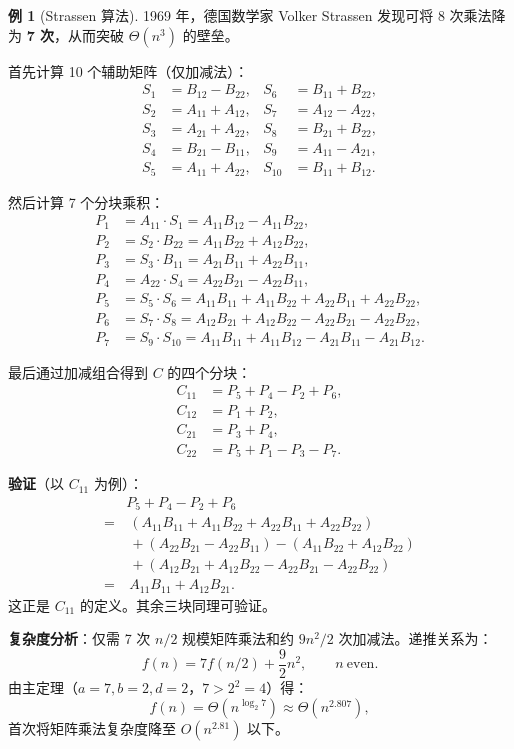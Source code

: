 \documentclass[UTF8,11pt,a4paper]{ctexbook}   %
\theoremstyle{definition}
\newtheorem{example}{例}[section]
\begin{document}
\begin{example}[Strassen 算法]
1969 年，德国数学家 Volker Strassen 发现可将 8 次乘法降为 \textbf{7 次}，从而突破 $\Theta(n^3)$ 的壁垒。

首先计算 10 个辅助矩阵（仅加减法）：
\begin{align*}
S_1 &= B_{12} - B_{22}, & S_6 &= B_{11} + B_{22},\\
S_2 &= A_{11} + A_{12}, & S_7 &= A_{12} - A_{22},\\
S_3 &= A_{21} + A_{22}, & S_8 &= B_{21} + B_{22},\\
S_4 &= B_{21} - B_{11}, & S_9 &= A_{11} - A_{21},\\
S_5 &= A_{11} + A_{22}, & S_{10} &= B_{11} + B_{12}.
\end{align*}

然后计算 7 个分块乘积：
\begin{align*}
P_1 &= A_{11}\cdot S_1 = A_{11}B_{12} - A_{11}B_{22},\\
P_2 &= S_2\cdot B_{22} = A_{11}B_{22} + A_{12}B_{22},\\
P_3 &= S_3\cdot B_{11} = A_{21}B_{11} + A_{22}B_{11},\\
P_4 &= A_{22}\cdot S_4 = A_{22}B_{21} - A_{22}B_{11},\\
P_5 &= S_5\cdot S_6 = A_{11}B_{11} + A_{11}B_{22} + A_{22}B_{11} + A_{22}B_{22},\\
P_6 &= S_7\cdot S_8 = A_{12}B_{21} + A_{12}B_{22} - A_{22}B_{21} - A_{22}B_{22},\\
P_7 &= S_9\cdot S_{10} = A_{11}B_{11} + A_{11}B_{12} - A_{21}B_{11} - A_{21}B_{12}.
\end{align*}

最后通过加减组合得到 $C$ 的四个分块：
\begin{align*}
C_{11} &= P_5 + P_4 - P_2 + P_6,\\
C_{12} &= P_1 + P_2,\\
C_{21} &= P_3 + P_4,\\
C_{22} &= P_5 + P_1 - P_3 - P_7.
\end{align*}

\textbf{验证}（以 $C_{11}$ 为例）：
\begin{align*}
& P_5 + P_4 - P_2 + P_6\\
=&\ (A_{11}B_{11} + A_{11}B_{22} + A_{22}B_{11} + A_{22}B_{22})\\
&\ + (A_{22}B_{21} - A_{22}B_{11}) - (A_{11}B_{22} + A_{12}B_{22})\\
&\ + (A_{12}B_{21} + A_{12}B_{22} - A_{22}B_{21} - A_{22}B_{22})\\
=&\ A_{11}B_{11} + A_{12}B_{21}.
\end{align*}
这正是 $C_{11}$ 的定义。其余三块同理可验证。

\textbf{复杂度分析}：仅需 7 次 $n/2$ 规模矩阵乘法和约 $9n^2/2$ 次加减法。递推关系为：
\[
f(n) = 7f(n/2) + \frac{9}{2}n^2,\qquad n\ \text{even}.
\]
由主定理（$a=7,b=2,d=2$，$7>2^2=4$）得：
\[
f(n) = \Theta(n^{\log_2 7}) \approx \Theta(n^{2.807}),
\]
首次将矩阵乘法复杂度降至 $O(n^{2.81})$ 以下。
\end{example}
\end{document}
